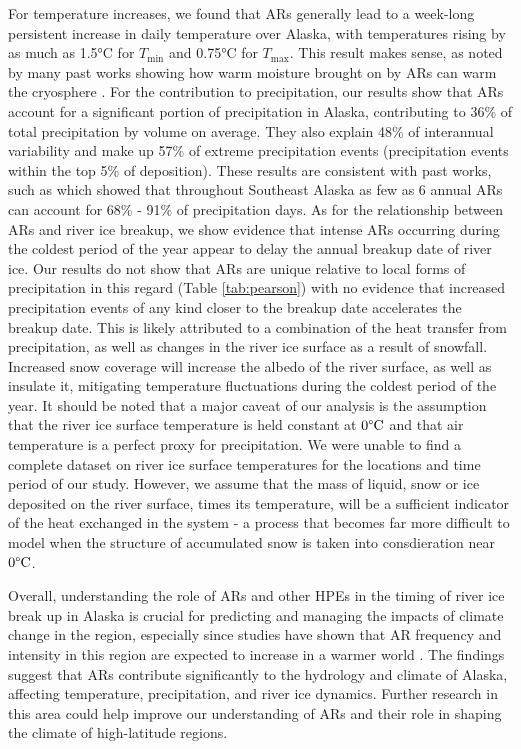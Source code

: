 \documentclass[12pts,draft]{AR_analysis_}
\begin{document}
For temperature increases, we found that ARs generally lead to a week-long persistent 
increase in daily temperature over Alaska, with temperatures rising by as much as 1.5°C 
for $T_{\text{min}}$ and 0.75°C for $T_{\text{max}}$. This result makes sense, as noted 
by many past works showing how warm moisture brought on by ARs can warm the cryosphere
\cite{Wille2021, Ma2023, ARs_lead_to_sea_ice_loss, Zhang2023}. For the contribution to 
precipitation, our results show that ARs account for a significant portion of precipitation 
in Alaska, contributing to 36\% of total precipitation by volume on 
average. They also explain 48\% 
of interannual variability and make up 57\% of extreme precipitation events 
(precipitation events within the top 5\% of deposition). These results are
consistent 
with past works, such as  which showed that throughout Southeast Alaska
as few as 6 annual ARs can account for 68\% - 91\% of precipitation days. As for 
the relationship between ARs and river ice breakup, we show evidence that intense ARs
occurring during the coldest period of the year appear to delay the annual breakup 
date of river ice. Our results do not show that ARs are unique relative to local forms of 
precipitation in this regard (Table \ref{tab:pearson}) with no evidence that increased 
precipitation events of any kind closer to the breakup date accelerates the breakup date.
This is likely attributed to a combination of the heat transfer from precipitation, 
as well as changes in the river ice surface as a result of snowfall. Increased snow coverage
will increase the albedo of the river surface, as well as insulate it, mitigating temperature 
fluctuations during the coldest period of the year. It should be noted that a major caveat of
our analysis is the assumption that the river ice surface temperature is held constant at
$\mathrm{0\degree C}$ and that air temperature is a perfect proxy for precipitation. We were unable to 
find a complete dataset on river ice surface temperatures for the locations and time 
period of our study. However, we assume that the mass of liquid, snow or ice deposited on 
the river surface, times its temperature, will be a sufficient indicator of the heat
exchanged in the system - a process that becomes far more difficult to model when the 
structure of accumulated snow is taken into consdieration near $\mathrm{0\degree C}$.   

Overall, understanding the role of ARs and other HPEs in the
timing of river ice break up in Alaska is 
crucial for predicting and managing the impacts of climate change in the region, 
especially since studies have shown that AR frequency and intensity in this region are 
expected to increase in a warmer world \cite{Espinoza2018, Massoud2019}. The findings 
suggest that ARs contribute significantly to the hydrology and climate of Alaska, 
affecting temperature, precipitation, and river ice dynamics. Further research in this 
area could help improve our understanding of ARs and their role in shaping the climate 
of high-latitude regions.
\end{document}
